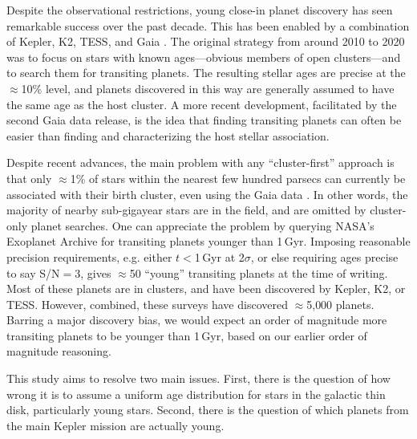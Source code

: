 \documentclass[11pt,twocolumn,tighten]{aastex63}
\begin{document}

Despite the observational restrictions, young close-in planet
discovery has seen remarkable success over the past decade.
This has been enabled by a combination of Kepler, K2, TESS, and Gaia
\citep[e.g.][]{Meibom_2013,Mann_K2_25_2016,Mann_2017,Curtis_2018,Livingston_2018,David_2019,Bouma_2020_toi837,Rizzuto_2020,Plavchan_2020,Newton_2021,Nardiello_2022,Tofflemire_2021,Barber_2022,Bouma_2022a,Bouma_2022b,Zhou_2022,Zakhozhay_2022,Wood_2023}.
The original strategy from around 2010 to 2020 was to focus on stars
with known ages---obvious members of open clusters---and to search
them for transiting planets.  
The resulting stellar ages are precise at the $\approx$10\% level, and
planets discovered in this way are generally assumed to have the same
age as the host cluster.  
A more recent development, facilitated by the second Gaia data
release, is the idea that finding transiting planets can often be
easier than finding and characterizing the host stellar association.

Despite recent advances, the main problem with any ``cluster-first'' approach is that
only $\approx$1\% of stars within the nearest few hundred parsecs can
currently be associated with their birth cluster, even using the Gaia
data
\citep[e.g.][]{Zari_2018,CantatGaudin_2020,Kounkel_2020,Kerr_2021}.
In other words, the majority of nearby sub-gigayear stars are in the
field, and are omitted by cluster-only planet searches.  
One can appreciate the problem by querying NASA's Exoplanet Archive
for transiting planets younger than 1\,Gyr.
Imposing reasonable precision requirements, e.g. either $t$$<$1\,Gyr
at 2$\sigma$, or else requiring ages precise to say S/N$=$3, gives $\approx$50 ``young'' transiting planets at the time of writing.
Most of these planets are in clusters, and have been discovered by Kepler, K2, or TESS.  
However, combined, these surveys have discovered
$\approx$5{,}000 planets.  Barring a major discovery bias, we
would expect an order of magnitude more transiting 
planets to be younger than 1\,Gyr, based on our earlier order of
magnitude reasoning.

This study aims to resolve two main issues.
First, there is the question of how wrong it is to assume a uniform age
distribution for stars in the galactic thin disk, particularly young stars.
Second, there is the question of which planets from the main Kepler
mission are actually young.
\end{document}
